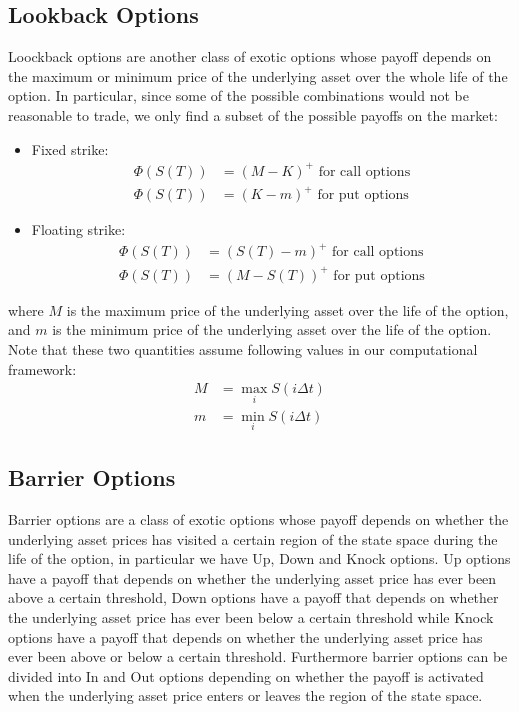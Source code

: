 \subsection*{Lookback Options}
Loockback options are another class of exotic options whose payoff depends on
the maximum or minimum price of the underlying asset over the whole life of
the option. In particular, since some of the possible combinations would not be
reasonable to trade, we only find a subset of the possible payoffs on the
market:

\begin{itemize}
    \item Fixed strike: \begin{align*}
        \Phi(S(T)) & = (M - K)^+ \text{ for call options} \\
        \Phi(S(T)) & = (K - m)^+ \text{ for put options}
    \end{align*}
    \item Floating strike: \begin{align*}
        \Phi(S(T)) & = (S(T)-m)^+ \text{ for call options} \\
        \Phi(S(T)) & = (M-S(T))^+ \text{ for put options}
    \end{align*}
\end{itemize}

where $M$ is the maximum price of the underlying asset over the life of the
option, and $m$ is the minimum price of the underlying asset over the life of
the option. Note that these two quantities assume following values in our
computational framework:
\begin{align*}
    M & = \max_i S(i\Delta t) \\
    m & = \min_i S(i\Delta t)
\end{align*}

\subsection*{Barrier Options}
Barrier options are a class of exotic options whose payoff depends on whether
the underlying asset prices has visited a certain region of the state space
during the life of the option, in particular we have Up, Down and Knock options.
Up options have a payoff that depends on whether the underlying asset price has
ever been above a certain threshold, Down options have a payoff that depends on
whether the underlying asset price has ever been below a certain threshold while
Knock options have a payoff that depends on whether the underlying asset price
has ever been above or below a certain threshold. Furthermore barrier options
can be divided into In and Out options depending on whether the payoff is
activated when the underlying asset price enters or leaves the region of the
state space.

